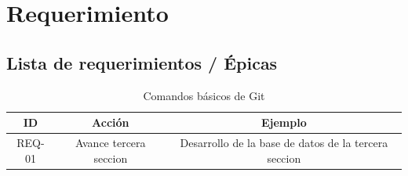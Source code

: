 



\section{Requerimiento}


\subsection{Lista de requerimientos / Épicas}

    
   \begin{table}[H]
    \centering %
        \begin{tabular}{|c|c|c|} %
            \hline
            \textbf{ID}    &   \textbf{Acción}     &   \textbf{Ejemplo}        \\ \hline
            REQ-01         &   Avance tercera seccion  &   Desarrollo de la base de datos de la tercera seccion  \\ \hline
            
        \end{tabular}
    \caption{Comandos básicos de Git} %
    \end{table}



    
